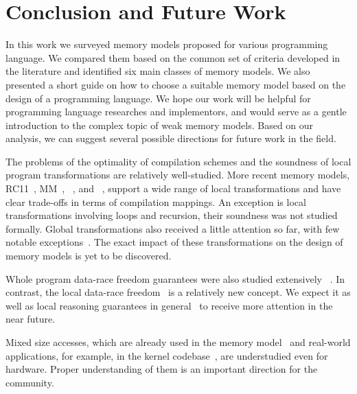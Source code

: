 \section{Conclusion and Future Work}
\label{sec:conclusion}

In this work we surveyed memory models 
proposed for various programming language. 
We compared them based on the common set of criteria
developed in the literature and identified 
six main classes of memory models.
We also presented a short guide on how to 
choose a suitable memory model based on 
the design of a programming language. 
We hope our work will be helpful for 
programming language researches and implementors,
and would serve as a gentle introduction 
to the complex topic of weak memory models. 
Based on our analysis, we can suggest several
possible directions for future work in the field. 

The problems of the optimality of compilation schemes
and the soundness of local program transformations are relatively well-studied.
More recent memory models,
RC11~\cite{Lahav-al:PLDI17},
\OCaml MM~\cite{Dolan-al:PLDI18},
\Promising~\cite{Kang-al:POPL17,Lee-al:PLDI20},
and \Weakestmo~\cite{Chakraborty-Vafeiadis:POPL19},
support a wide range of local transformations and have clear 
trade-offs in terms of compilation mappings. 
An exception is local transformations involving loops and recursion, 
their soundness was not studied formally. 
Global transformations also received a little attention so far,
with few notable exceptions~\cite{PichonPharabod-Sewell:POPL16, Lee-al:PLDI20}.
The exact impact of these transformations on the design of 
memory models is yet to be discovered. 

Whole program data-race freedom guarantees were also studied extensively~%
\cite{Manson-al:POPL05, Batty-al:ESOP15, Lahav-al:PLDI17, Kang-al:POPL17}. 
In contrast, the local data-race freedom~\cite{Dolan-al:PLDI18} 
is a relatively new concept. 
We expect it as well as local reasoning guarantees 
in general~\cite{Dodds-al:ESOP18, Jagadeesan-al:OOPSLA2020, Cho-al:PLDI21} 
to receive more attention in the near future.  

Mixed size accesses\cite{Flur-al:POPL17},
which are already used in the \JS memory model~\cite{Watt-al:PLDI2020}
and real-world applications, for example, in the \Linux kernel codebase~\cite{Flur-al:POPL17},
are understudied even for hardware.
Proper understanding of them is an important direction for the community. 

